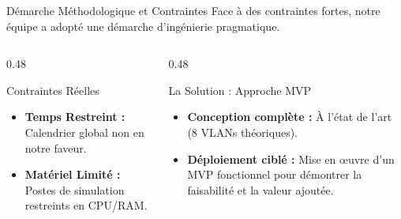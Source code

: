 \begin{frame}{Démarche Méthodologique et Contraintes}
    Face à des contraintes fortes, notre équipe a adopté une démarche d'ingénierie pragmatique.

    \begin{columns}[T]
        \begin{column}{0.48\textwidth}
            \begin{block}{Contraintes Réelles}
                \begin{itemize}
                    \item \textbf{Temps Restreint :} Calendrier global non en notre faveur.
                    \item \textbf{Matériel Limité :} Postes de simulation restreints en CPU/RAM.
                \end{itemize}
            \end{block}
        \end{column}

        \begin{column}{0.48\textwidth}
            \begin{block}{La Solution : Approche MVP}
                \begin{itemize}
                    \item \textbf{Conception complète :} À l'état de l'art (8 VLANs théoriques).
                    \item \textbf{Déploiement ciblé :} Mise en œuvre d'un MVP fonctionnel  pour démontrer la faisabilité et la valeur ajoutée.
                \end{itemize}
            \end{block}
        \end{column}
    \end{columns}
\end{frame}

